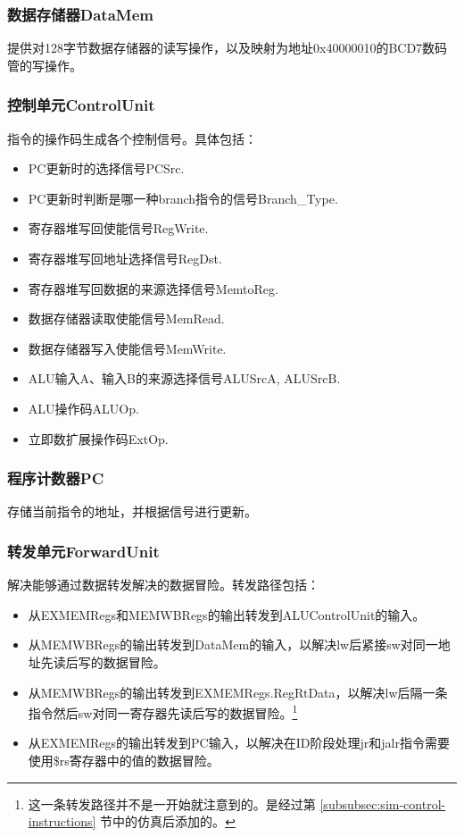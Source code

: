 \subsubsection{数据存储器DataMem}
提供对128字节数据存储器的读写操作，以及映射为地址0x40000010的BCD7数码管的写操作。

\subsubsection{控制单元ControlUnit}
指令的操作码生成各个控制信号。具体包括：
\begin{itemize}
    \item PC更新时的选择信号PCSrc.
    \item PC更新时判断是哪一种branch指令的信号Branch\_Type.
    \item 寄存器堆写回使能信号RegWrite.
    \item 寄存器堆写回地址选择信号RegDst.
    \item 寄存器堆写回数据的来源选择信号MemtoReg.
    \item 数据存储器读取使能信号MemRead.
    \item 数据存储器写入使能信号MemWrite.
    \item ALU输入A、输入B的来源选择信号ALUSrcA, ALUSrcB.
    \item ALU操作码ALUOp.
    \item 立即数扩展操作码ExtOp.
\end{itemize}

\subsubsection{程序计数器PC}
存储当前指令的地址，并根据信号进行更新。

\subsubsection{转发单元ForwardUnit}
解决能够通过数据转发解决的数据冒险。转发路径包括：
\begin{itemize}
    \item 从EXMEMRegs和MEMWBRegs的输出转发到ALUControlUnit的输入。
    \item 从MEMWBRegs的输出转发到DataMem的输入，以解决lw后紧接sw对同一地址先读后写的数据冒险。
    \item 从MEMWBRegs的输出转发到EXMEMRegs.RegRtData，以解决lw后隔一条指令然后sw对同一寄存器先读后写的数据冒险。\footnote{这一条转发路径并不是一开始就注意到的。是经过第 \ref{subsubsec:sim-control-instructions} 节中的仿真后添加的。}
    \item 从EXMEMRegs的输出转发到PC输入，以解决在ID阶段处理jr和jalr指令需要使用\$rs寄存器中的值的数据冒险。
\end{itemize}

